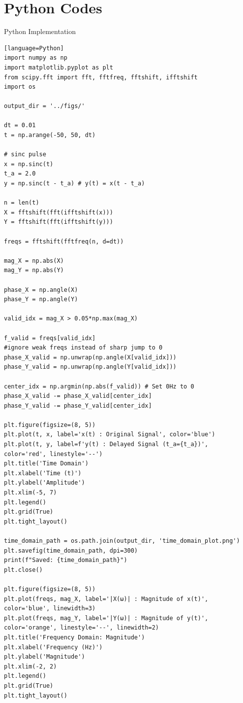 \documentclass{beamer}
\theoremstyle{remark}
\numberwithin{equation}{section}
\begin{document}
\section{Python Codes}
\begin{frame}{Python Implementation}
\begin{lstlisting}[basicstyle=\scriptsize\ttfamily][language=Python]
import numpy as np
import matplotlib.pyplot as plt
from scipy.fft import fft, fftfreq, fftshift, ifftshift
import os

output_dir = '../figs/'

dt = 0.01
t = np.arange(-50, 50, dt)

# sinc pulse
x = np.sinc(t)
t_a = 2.0 
y = np.sinc(t - t_a) # y(t) = x(t - t_a)

n = len(t)
X = fftshift(fft(ifftshift(x)))
Y = fftshift(fft(ifftshift(y)))

freqs = fftshift(fftfreq(n, d=dt))

mag_X = np.abs(X)
mag_Y = np.abs(Y)

phase_X = np.angle(X)
phase_Y = np.angle(Y)

valid_idx = mag_X > 0.05*np.max(mag_X)

f_valid = freqs[valid_idx]
#ignore weak freqs instead of sharp jump to 0
phase_X_valid = np.unwrap(np.angle(X[valid_idx]))
phase_Y_valid = np.unwrap(np.angle(Y[valid_idx]))

center_idx = np.argmin(np.abs(f_valid)) # Set 0Hz to 0
phase_X_valid -= phase_X_valid[center_idx]
phase_Y_valid -= phase_Y_valid[center_idx]

plt.figure(figsize=(8, 5))
plt.plot(t, x, label='x(t) : Original Signal', color='blue')
plt.plot(t, y, label=f'y(t) : Delayed Signal (t_a={t_a})', color='red', linestyle='--')
plt.title('Time Domain')
plt.xlabel('Time (t)')
plt.ylabel('Amplitude')
plt.xlim(-5, 7)
plt.legend()
plt.grid(True)
plt.tight_layout()

time_domain_path = os.path.join(output_dir, 'time_domain_plot.png')
plt.savefig(time_domain_path, dpi=300)
print(f"Saved: {time_domain_path}")
plt.close()

plt.figure(figsize=(8, 5))
plt.plot(freqs, mag_X, label='|X(ω)| : Magnitude of x(t)', color='blue', linewidth=3)
plt.plot(freqs, mag_Y, label='|Y(ω)| : Magnitude of y(t)', color='orange', linestyle='--', linewidth=2)
plt.title('Frequency Domain: Magnitude')
plt.xlabel('Frequency (Hz)')
plt.ylabel('Magnitude')
plt.xlim(-2, 2)
plt.legend()
plt.grid(True)
plt.tight_layout()


\end{lstlisting}
\end{frame}
\end{document}
